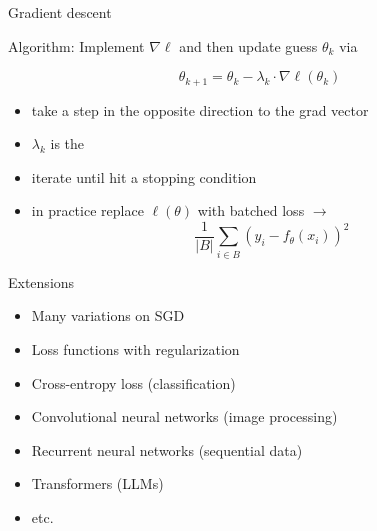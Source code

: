 \begin{frame}{Gradient descent}

    Algorithm: Implement $\nabla \ell$ and then update guess $\theta_k$ via
    
    \begin{equation*}
        \theta_{k+1} = \theta_k - \lambda_k \cdot \nabla \ell(\theta_k)
    \end{equation*}

    \begin{itemize}
        \item take a step in the opposite direction to the grad vector
        \vspace{0.5em}
        \item $\lambda_k$ is the  
        \vspace{0.5em}
        \item iterate until hit a stopping condition
        \vspace{0.5em}
        \item in practice replace $\ell(\theta)$ with batched loss $\to$ 
            \begin{equation*}
                \frac{1}{|B|}\sum_{i \in B} (y_i - f_\theta(x_i))^2
            \end{equation*}
    \end{itemize}


\end{frame}


\begin{frame}{Extensions}


    \begin{itemize}
        \item Many variations on SGD
        \vspace{0.5em}
        \item Loss functions with regularization
        \vspace{0.5em}
        \item Cross-entropy loss (classification)
        \vspace{0.5em}
        \item Convolutional neural networks (image processing)
        \vspace{0.5em}
        \item Recurrent neural networks (sequential data)
        \vspace{0.5em}
        \item Transformers (LLMs)
        \vspace{0.5em}
        \item etc.
    \end{itemize}
    
\end{frame}



